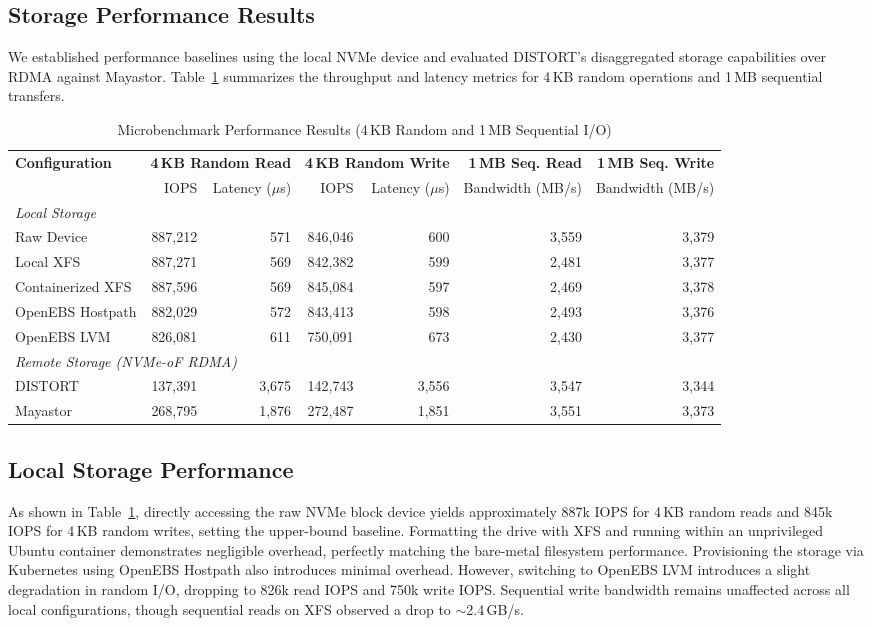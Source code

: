 \documentclass[sigconf]{acmart}
\begin{document}
\subsection{Storage Performance Results}
We established performance baselines using the local NVMe device and evaluated DISTORT's disaggregated storage capabilities over RDMA against Mayastor. Table~\ref{tab:performance} summarizes the throughput and latency metrics for 4\,KB random operations and 1\,MB sequential transfers.

\begin{table}[t]
\centering
\caption{Microbenchmark Performance Results (4\,KB Random and 1\,MB Sequential I/O)}
\label{tab:performance}
\begin{tabular}{l||rr|rr||rr}
\toprule
\textbf{Configuration} & \multicolumn{2}{c|}{\textbf{4\,KB Random Read}} & \multicolumn{2}{c||}{\textbf{4\,KB Random Write}} & \textbf{1\,MB Seq. Read} & \textbf{1\,MB Seq. Write} \\
& IOPS & Latency ($\mu$s) & IOPS & Latency ($\mu$s) & Bandwidth (MB/s) & Bandwidth (MB/s) \\
\midrule
\multicolumn{7}{l}{\textit{Local Storage}} \\
Raw Device & 887,212 & 571 & 846,046 & 600 & 3,559 & 3,379 \\
Local XFS & 887,271 & 569 & 842,382 & 599 & 2,481 & 3,377 \\
Containerized XFS & 887,596 & 569 & 845,084 & 597 & 2,469 & 3,378 \\
OpenEBS Hostpath & 882,029 & 572 & 843,413 & 598 & 2,493 & 3,376 \\
OpenEBS LVM & 826,081 & 611 & 750,091 & 673 & 2,430 & 3,377 \\
\midrule
\multicolumn{7}{l}{\textit{Remote Storage (NVMe-oF RDMA)}} \\
DISTORT & 137,391 & 3,675 & 142,743 & 3,556 & 3,547 & 3,344 \\
Mayastor & 268,795 & 1,876 & 272,487 & 1,851 & 3,551 & 3,373 \\
\bottomrule
\end{tabular}
\end{table}

\subsection{Local Storage Performance}
As shown in Table~\ref{tab:performance}, directly accessing the raw NVMe block device yields approximately 887k IOPS for 4\,KB random reads and 845k IOPS for 4\,KB random writes, setting the upper-bound baseline. Formatting the drive with XFS and running within an unprivileged Ubuntu container demonstrates negligible overhead, perfectly matching the bare-metal filesystem performance. Provisioning the storage via Kubernetes using OpenEBS Hostpath also introduces minimal overhead. However, switching to OpenEBS LVM introduces a slight degradation in random I/O, dropping to 826k read IOPS and 750k write IOPS. Sequential write bandwidth remains unaffected across all local configurations, though sequential reads on XFS observed a drop to $\sim$2.4\,GB/s.
\end{document}
